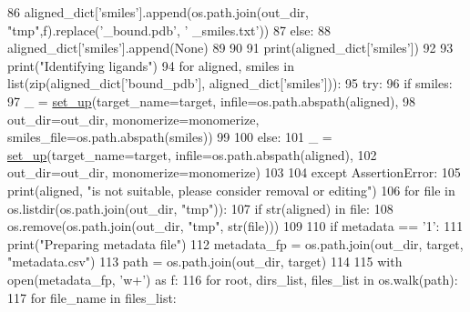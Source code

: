 \begin{DoxyCode}
86                 aligned\_dict[\textcolor{stringliteral}{'smiles'}].append(os.path.join(out\_dir, \textcolor{stringliteral}{"tmp"},f).replace(\textcolor{stringliteral}{'\_bound.pdb'}, \textcolor{stringliteral}{'
      \_smiles.txt'}))
87             \textcolor{keywordflow}{else}:
88                 aligned\_dict[\textcolor{stringliteral}{'smiles'}].append(\textcolor{keywordtype}{None})
89 
90 
91     print(aligned\_dict[\textcolor{stringliteral}{'smiles'}])
92 
93     print(\textcolor{stringliteral}{"Identifying ligands"})
94     \textcolor{keywordflow}{for} aligned, smiles \textcolor{keywordflow}{in} list(zip(aligned\_dict[\textcolor{stringliteral}{'bound\_pdb'}], aligned\_dict[\textcolor{stringliteral}{'smiles'}])):
95         \textcolor{keywordflow}{try}:
96             \textcolor{keywordflow}{if} smiles:
97                 \_ = \hyperlink{namespacefragalysis__api_1_1xcimporter_1_1conversion__pdb__mol_ab8fa8ff14ff0439b99603cbbd33472e2}{set\_up}(target\_name=target, infile=os.path.abspath(aligned),
98                              out\_dir=out\_dir, monomerize=monomerize, smiles\_file=os.path.abspath(smiles))
99                 
100             \textcolor{keywordflow}{else}:
101                 \_ = \hyperlink{namespacefragalysis__api_1_1xcimporter_1_1conversion__pdb__mol_ab8fa8ff14ff0439b99603cbbd33472e2}{set\_up}(target\_name=target, infile=os.path.abspath(aligned),
102                 out\_dir=out\_dir, monomerize=monomerize)
103                 
104         \textcolor{keywordflow}{except} AssertionError:
105             print(aligned, \textcolor{stringliteral}{"is not suitable, please consider removal or editing"})
106             \textcolor{keywordflow}{for} file \textcolor{keywordflow}{in} os.listdir(os.path.join(out\_dir, \textcolor{stringliteral}{"tmp"})):
107                 \textcolor{keywordflow}{if} str(aligned) \textcolor{keywordflow}{in} file:
108                     os.remove(os.path.join(out\_dir, \textcolor{stringliteral}{"tmp"}, str(file)))
109 
110     \textcolor{keywordflow}{if} metadata == \textcolor{stringliteral}{'1'}:
111         print(\textcolor{stringliteral}{"Preparing metadata file"})
112         metadata\_fp = os.path.join(out\_dir, target, \textcolor{stringliteral}{"metadata.csv"})
113         path = os.path.join(out\_dir, target)
114 
115         with open(metadata\_fp, \textcolor{stringliteral}{'w+'}) \textcolor{keyword}{as} f:
116             \textcolor{keywordflow}{for} root, dirs\_list, files\_list \textcolor{keywordflow}{in} os.walk(path):
117                 \textcolor{keywordflow}{for} file\_name \textcolor{keywordflow}{in} files\_list:

\end{DoxyCode}

